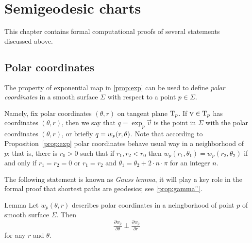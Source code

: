 \chapter{Semigeodesic charts}\label{chap:semigeodesic}

This chapter contains formal computational proofs of several statements discussed above.

\section{Polar coordinates}

The property of exponential map in \ref{prop:exp} can be used to define \emph{polar coordinates} in a smooth surface $\Sigma$ with respect to a point $p\in \Sigma$.

Namely, fix polar coordinates $(\theta,r)$ on tangent plane $\mathrm{T}_p$.
If $\textsc v\in \mathrm{T}_p$ has coordinates $(\theta,r)$,
then we say that $q=\exp_p\vec v$ is the point in $\Sigma$ with the polar coordinates $(\theta,r)$, or briefly $q\z=w_p(r,\theta)$.
Note that according to Proposition~\ref{prop:exp} polar coordinates behave usual way in a neighborhood of $p$;
that is, there is $r_0>0$ such that if $r_1,r_2<r_0$ then $w_p(r_1,\theta_1) = w_p(r_2,\theta_2)$ if and only if
$r_1=r_2=0$ or $r_1=r_2$ and $\theta_1=\theta_2+2\cdot n\cdot\pi$ for an integer $n$.

The following statement is known as \emph{Gauss lemma},
it will play a key role in the formal proof that shortest paths are geodesics; see \ref{prop:gamma''}.

\begin{thm}{Lemma}\label{lem:palar-perp}
Let $w_p(\theta,r)$ describes polar coordinates in a neingborhood of point $p$ of smooth surface $\Sigma$.
Then
\[\tfrac{\partial w_p}{\partial\theta}\perp\tfrac{\partial w_p}{\partial r}\]
for any $r$ and $\theta$.
\end{thm}


